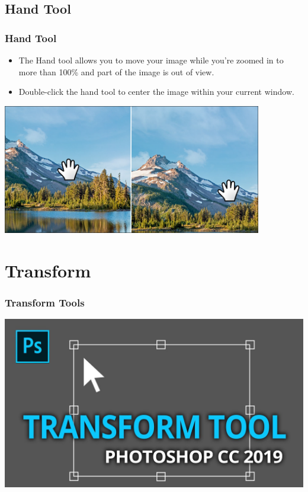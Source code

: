 \documentclass{beamer}
\begin{document}
\subsection{Hand Tool}
\begin{frame}
	\frametitle{Hand Tool}
	\begin{itemize}
		\item The Hand tool allows you to move your image while you're zoomed in to more than 100\% and part of the image is out of view.
		\item Double-click the hand tool to center the image within your current window.
	\end{itemize}
	\begin{center}
		\includegraphics[width = 0.85\textwidth]{images/hand tool.png}
	\end{center}
\end{frame}

	\section{Transform}
	
			\begin{frame}
		\frametitle{Transform Tools}
		\begin{center}
			\includegraphics[width=1.0\textwidth]{images/transform.jpg}
		\end{center}
	\end{frame}
	
\end{document}
